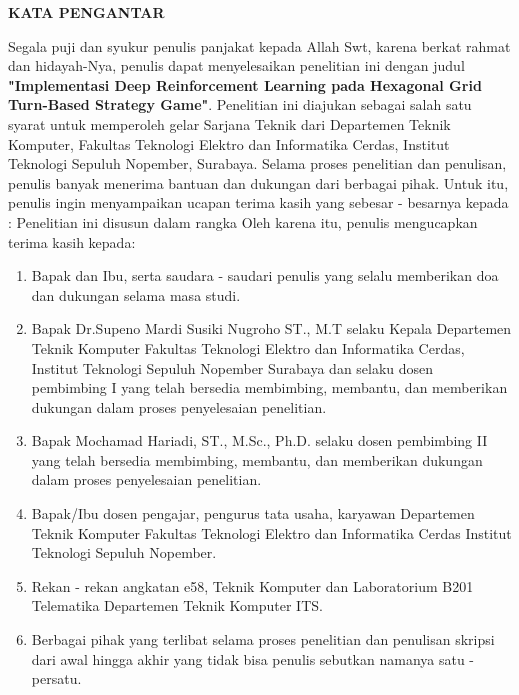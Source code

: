 \begin{center}
  \Large
  \textbf{KATA PENGANTAR}
\end{center}


\vspace{2ex}


Segala puji dan syukur penulis panjakat kepada Allah Swt,
karena berkat rahmat dan hidayah-Nya, penulis dapat menyelesaikan
penelitian ini dengan judul \textbf{"Implementasi Deep Reinforcement Learning pada Hexagonal Grid Turn-Based Strategy Game"}.
Penelitian ini diajukan sebagai salah satu syarat untuk memperoleh gelar Sarjana Teknik
dari Departemen Teknik Komputer, Fakultas Teknologi Elektro dan Informatika Cerdas, Institut
Teknologi Sepuluh Nopember, Surabaya. Selama proses penelitian dan penulisan, penulis
banyak menerima bantuan dan dukungan dari berbagai pihak. Untuk itu, penulis ingin menyampaikan
ucapan terima kasih yang sebesar - besarnya kepada :
Penelitian ini disusun dalam rangka \lipsum[2][1-5]
Oleh karena itu, penulis mengucapkan terima kasih kepada:

\begin{enumerate}[nolistsep]

  \item Bapak dan Ibu, serta saudara - saudari penulis yang selalu memberikan doa dan dukungan selama masa studi.

  \item Bapak Dr.Supeno Mardi Susiki Nugroho ST., M.T selaku Kepala Departemen Teknik Komputer Fakultas Teknologi Elektro dan Informatika Cerdas, Institut Teknologi Sepuluh Nopember Surabaya dan selaku dosen pembimbing I yang telah bersedia membimbing, membantu, dan memberikan dukungan dalam proses penyelesaian penelitian.
  \item Bapak Mochamad Hariadi, ST., M.Sc., Ph.D. selaku dosen pembimbing II yang telah bersedia membimbing, membantu, dan memberikan dukungan dalam proses penyelesaian penelitian.
  \item Bapak/Ibu dosen pengajar, pengurus tata usaha, karyawan Departemen Teknik Komputer Fakultas Teknologi Elektro dan Informatika Cerdas Institut Teknologi Sepuluh Nopember.
  \item Rekan - rekan angkatan e58, Teknik Komputer dan Laboratorium B201 Telematika Departemen Teknik Komputer ITS.
  \item Berbagai pihak yang terlibat selama proses penelitian dan penulisan skripsi dari awal hingga akhir yang tidak bisa penulis sebutkan namanya satu - persatu.

\end{enumerate}


